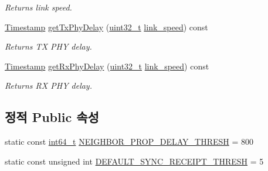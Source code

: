 \begin{DoxyCompactItemize}
\begin{DoxyCompactList}\small\item\em Returns link speed. \end{DoxyCompactList}\item 
\hyperlink{class_timestamp}{Timestamp} \hyperlink{class_common_port_a712d7ef3c08417057a911fa3fa574770}{get\+Tx\+Phy\+Delay} (\hyperlink{parse_8c_a6eb1e68cc391dd753bc8ce896dbb8315}{uint32\+\_\+t} \hyperlink{class_common_port_aae24fc4f200e75aa8215f797b2561dbf}{link\+\_\+speed}) const 
\begin{DoxyCompactList}\small\item\em Returns TX P\+HY delay. \end{DoxyCompactList}\item 
\hyperlink{class_timestamp}{Timestamp} \hyperlink{class_common_port_a4c0962d6e8bd5a6296d9cdd77d26c30e}{get\+Rx\+Phy\+Delay} (\hyperlink{parse_8c_a6eb1e68cc391dd753bc8ce896dbb8315}{uint32\+\_\+t} \hyperlink{class_common_port_aae24fc4f200e75aa8215f797b2561dbf}{link\+\_\+speed}) const 
\begin{DoxyCompactList}\small\item\em Returns RX P\+HY delay. \end{DoxyCompactList}\end{DoxyCompactItemize}
\subsection*{정적 Public 속성}
\begin{DoxyCompactItemize}
\item 
static const \hyperlink{parse_8c_a67a9885ef4908cb72ce26d75b694386c}{int64\+\_\+t} \hyperlink{class_common_port_ad2b817903e69443f936de3f2d195184d}{N\+E\+I\+G\+H\+B\+O\+R\+\_\+\+P\+R\+O\+P\+\_\+\+D\+E\+L\+A\+Y\+\_\+\+T\+H\+R\+E\+SH} = 800
\item 
static const unsigned int \hyperlink{class_common_port_a60ff1c9798251f4f4be45dfb8ea91614}{D\+E\+F\+A\+U\+L\+T\+\_\+\+S\+Y\+N\+C\+\_\+\+R\+E\+C\+E\+I\+P\+T\+\_\+\+T\+H\+R\+E\+SH} = 5
\end{DoxyCompactItemize}
